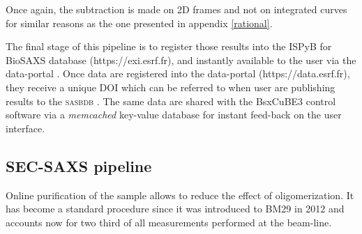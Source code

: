 \documentclass[preprint]{iucr}              %
\begin{document}
Once again, the subtraction is made on 2D frames and not on integrated curves for similar reasons as the one presented in appendix \ref{rational}.



The final stage of this pipeline is to register those results into the ISPyB for BioSAXS database \cite{ISPYBB} (https://exi.esrf.fr), and instantly available to the user via the data-portal \cite{data-portal}. 
Once data are registered into the data-portal (https://data.esrf.fr), they receive a unique DOI which can be referred to when user are publishing results to the \textsc{sasbdb} \cite{sasbdb}.
The same data are shared with the BsxCuBE3 control software via a \textit{memcached} key-value database for instant feed-back on the user interface.

\subsection{SEC-SAXS pipeline}
Online purification of the sample allows to reduce the effect of oligomerization.
It has become a standard procedure since it was introduced to BM29 in 2012 \cite{SECPaper2012} and accounts now for two third of all measurements performed at the beam-line.
\end{document}
